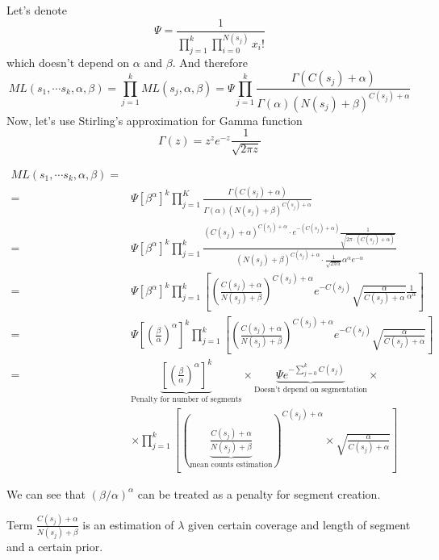 \documentclass[10pt,letterpaper]{article}
\begin{document}
Let's denote
$$
\Psi =  \frac 1 {\prod _{j=1} ^{k} \prod _{i=0} ^{N(s_j)} x_i!}
$$
which doesn't depend on $\alpha$ and $\beta$. 
And therefore
$$
ML(s_1, \cdots s_k, \alpha, \beta) = \prod _{j=1} ^{k} ML(s_j, \alpha, \beta) = \Psi \prod _{j=1} ^{k}  \frac {\Gamma(C(s_j)+\alpha)} {\Gamma(\alpha)(N(s_j)+\beta)^{C(s_j)+\alpha}}
$$
Now, let's use Stirling's approximation for Gamma function
$$
\Gamma(z) = z^z e^{-z} \frac 1 {\sqrt{2\pi z}}
$$

\begin{align*}
    ML(s_1, \cdots s_k, \alpha, \beta) = &\\
    =&\Psi \left[\beta^{\alpha}\right]^k  
    \prod _{j=1} ^{K}  
    \frac {\Gamma(C(s_j)+\alpha)} {\Gamma(\alpha)(N(s_j)+\beta)^{C(s_j)+\alpha}} \\
    =& \Psi \left[\beta^{\alpha}\right]^k
    \prod _{j=1} ^{k}
    \frac {(C(s_j)+\alpha)^{C(s_j)+\alpha}\cdot e^{-\left(C(s_j)+\alpha\right)}\frac 1 {\sqrt{2 \pi\cdot\left(C(s_j)+\alpha\right) }}} 
    {(N(s_j)+\beta)^{C(s_j)+\alpha}\cdot\frac 1 {\sqrt{2 \pi \alpha } }\alpha^\alpha e^{-\alpha}}\\
    =&
    \Psi\left[\beta^{\alpha}\right]^{k}
    \prod _{j=1} ^{k} \left[
    \left( \frac {C(s_j)+\alpha} {N(s_j)+\beta} \right) ^ {C(s_j)+\alpha} e^{-C(s_j)} \sqrt{\frac \alpha {C(s_j)+\alpha}} \frac 1 {\alpha^\alpha} \right]\\
    =&
    \Psi\left[\left(\frac {\beta} {\alpha} \right) ^{\alpha} \right]^k
    \prod _{j=1} ^{k} \left[
    \left( \frac {C(s_j)+\alpha} {N(s_j)+\beta} \right) ^ {C(s_j)+\alpha} e^{-C(s_j)} \sqrt{\frac \alpha {C(s_j)+\alpha}} 
    \right] \\
    =&
    \underbrace{
        \left[\left(\frac {\beta} {\alpha} \right) ^{\alpha}\right]^ k} 
        _{\text{Penalty for number of segments}
    }
    \times
    \underbrace{
        {\Psi e^{-\sum_{j=0} ^k C(s_j)}}} 
        _{\text{Doesn't depend on segmentation}
    }\times\\
    &\times\prod _{j=1} ^{k} \left[
    \left(\underbrace { \frac {C(s_j)+\alpha} {N(s_j)+\beta}}_{\text{mean counts estimation}} \right) ^ {C(s_j)+\alpha}  
    \times\sqrt{\frac \alpha {C(s_j)+\alpha}} \right]{}
\end{align*}

We can see that $(\beta/\alpha)^{\alpha}$ can be treated as a penalty for segment creation.

Term $\frac {C(s_j)+\alpha} {N(s_j)+\beta}$ is an estimation of $\lambda$ given certain coverage and length of segment and a certain prior.
\end{document}

